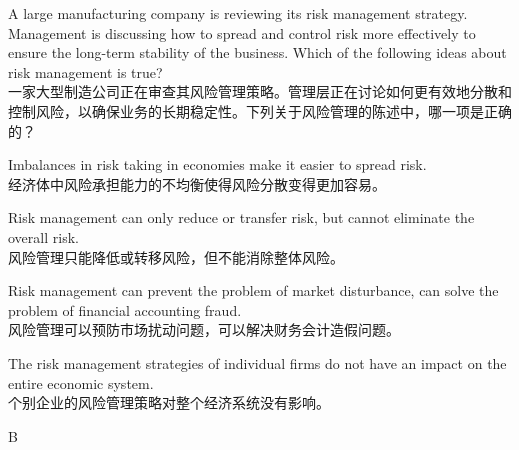 \documentclass{article}
\newcounter{question} %
\begin{document}
\begin{question}
    A large manufacturing company is reviewing its risk management strategy. Management is discussing how to spread and control risk more effectively to ensure the long-term stability of the business. Which of the following ideas about risk management is true? \\
    一家大型制造公司正在审查其风险管理策略。管理层正在讨论如何更有效地分散和控制风险，以确保业务的长期稳定性。下列关于风险管理的陈述中，哪一项是正确的？
\end{question}

\begin{choices}
    \item Imbalances in risk taking in economies make it easier to spread risk. \\
    经济体中风险承担能力的不均衡使得风险分散变得更加容易。
    \item Risk management can only reduce or transfer risk, but cannot eliminate the overall risk. \\
    风险管理只能降低或转移风险，但不能消除整体风险。
    \item Risk management can prevent the problem of market disturbance, can solve the problem of financial accounting fraud. \\
    风险管理可以预防市场扰动问题，可以解决财务会计造假问题。
    \item The risk management strategies of individual firms do not have an impact on the entire economic system. \\
    个别企业的风险管理策略对整个经济系统没有影响。
\end{choices}

\begin{correctanswer}
    B
\end{correctanswer}
\end{document}

